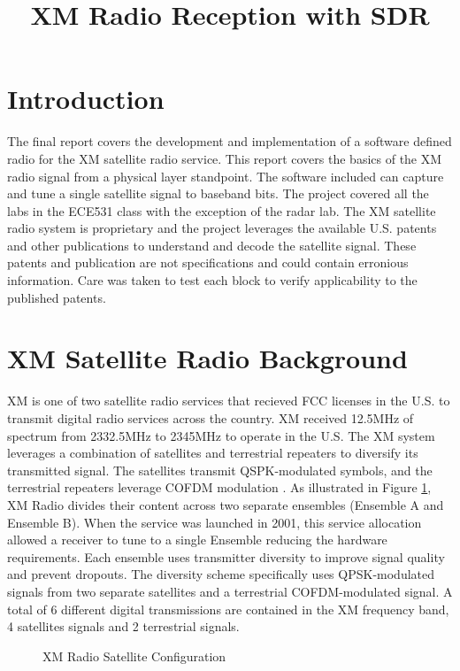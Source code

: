 \documentclass[conference,onecolumn]{IEEEtran}
\title{XM Radio Reception with SDR}
\author{
\IEEEauthorblockN{Owen Sowatzke}
\IEEEauthorblockA{\textit{Electrical Engineering Department} \\
\textit{University of Arizona}\\
Tucson, USA \\
osowatzke@arizona.edu}
\and
\IEEEauthorblockN{Glenn Alan Walker}
\IEEEauthorblockA{\textit{Electrical Engineering Department} \\
\textit{University of Arizona}\\
Tucson, USA \\
gaw@arizona.edu}}
\begin{document}
\maketitle

\section{Introduction} The final report covers the development and implementation of a software defined radio for the XM satellite radio service.  This report covers the basics of the XM radio signal from a physical layer standpoint.  The software included can capture and tune a single satellite signal to baseband bits.  The project covered all the labs in the ECE531 class with the exception of the radar lab.  The XM satellite radio system is proprietary and the project leverages the available U.S. patents and other publications to understand and decode the satellite signal.  These patents and publication are not specifications and could contain erronious information.  Care was taken to test each block to verify applicability to the published patents.  

\section{XM Satellite Radio Background}

XM is one of two satellite radio services that recieved FCC licenses in the U.S. to transmit digital radio services across the country.  XM received 12.5MHz of spectrum from 2332.5MHz to 2345MHz to operate in the U.S.  The XM system leverages a combination of satellites and terrestrial repeaters to diversify its transmitted signal. The satellites transmit QSPK-modulated symbols, and the terrestrial repeaters leverage COFDM modulation \cite{5586866}.  As illustrated in Figure \ref{fig::xm_satellite_config}, XM Radio divides their content across two separate ensembles (Ensemble A and Ensemble B).  When the service was launched in 2001, this service allocation allowed a receiver to tune to a single Ensemble reducing the hardware requirements.  Each ensemble uses transmitter diversity to improve signal quality and prevent dropouts. The diversity scheme specifically uses QPSK-modulated signals from two separate satellites and a terrestrial COFDM-modulated signal.  A total of 6 different digital transmissions are contained in the XM frequency band, 4 satellites signals and 2 terrestrial signals.  
\begin{figure}[H]
	\centerline{}
	\caption{XM Radio Satellite Configuration \cite{5586866}}
	\label{fig::xm_satellite_config}
\end{figure}
\end{document}
